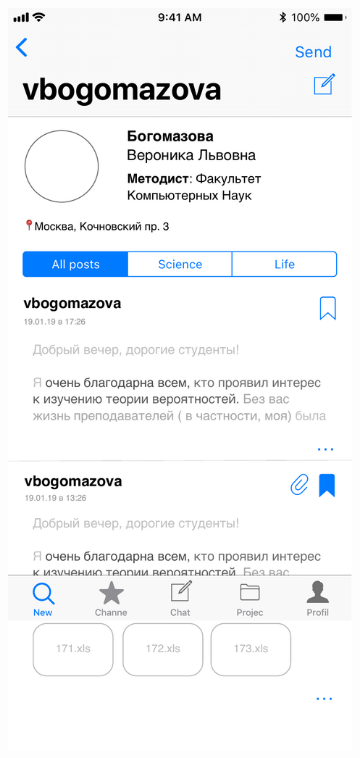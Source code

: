 \documentclass[a4paper,12pt,reqno]{article}
\begin{document}
	 \label{interface}
	\begin{figure}[h!]
		\centering
		\begin{subfigure}[b]{0.3\linewidth}
			\includegraphics[width=\linewidth]{../includes/prototype/1.pdf}

\end{subfigure}
\end{figure}
\end{document}
